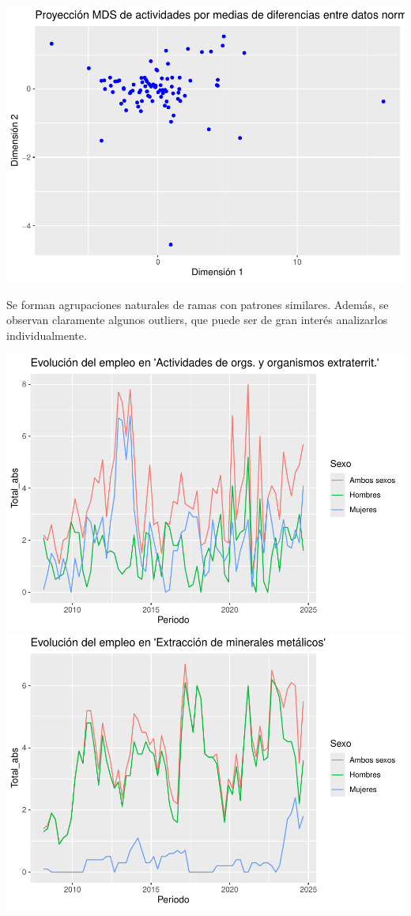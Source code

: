 \documentclass[notspecified,article,submit,moreauthors,pdftex]{Definitions/mdpi}
\begin{document}
\includegraphics{ProyectoAED2024_files/figure-latex/unnamed-chunk-43-1.pdf}

Se forman agrupaciones naturales de ramas con patrones similares.
Además, se observan claramente algunos outliers, que puede ser de gran
interés analizarlos individualmente.

\includegraphics{ProyectoAED2024_files/figure-latex/unnamed-chunk-44-1.pdf}
\includegraphics{ProyectoAED2024_files/figure-latex/unnamed-chunk-44-2.pdf}
\end{document}
